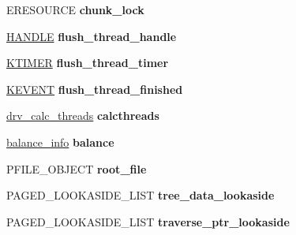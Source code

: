 \begin{DoxyCompactItemize}
\item 
\mbox{\label{struct__device__extension_a30106beebe204fefb92dcdefa857a7bc}} 
E\+R\+E\+S\+O\+U\+R\+CE {\bfseries chunk\+\_\+lock}
\item 
\mbox{\label{struct__device__extension_acc35853bebea7f2443c0e73a67527385}} 
\hyperlink{interfacevoid}{H\+A\+N\+D\+LE} {\bfseries flush\+\_\+thread\+\_\+handle}
\item 
\mbox{\label{struct__device__extension_a719c97122345d6682edd7704352fdf90}} 
\hyperlink{struct___k_t_i_m_e_r}{K\+T\+I\+M\+ER} {\bfseries flush\+\_\+thread\+\_\+timer}
\item 
\mbox{\label{struct__device__extension_a6901244d390909265b7b1e1bd2cd5d9d}} 
\hyperlink{struct___k_e_v_e_n_t}{K\+E\+V\+E\+NT} {\bfseries flush\+\_\+thread\+\_\+finished}
\item 
\mbox{\label{struct__device__extension_a0fecae7f0dfcc7d666621891fd63edfc}} 
\hyperlink{structdrv__calc__threads}{drv\+\_\+calc\+\_\+threads} {\bfseries calcthreads}
\item 
\mbox{\label{struct__device__extension_aa0cac93e722afaf64806cb49e4b9f353}} 
\hyperlink{structbalance__info}{balance\+\_\+info} {\bfseries balance}
\item 
\mbox{\label{struct__device__extension_af2b816839e5035596787f922a307dd79}} 
P\+F\+I\+L\+E\+\_\+\+O\+B\+J\+E\+CT {\bfseries root\+\_\+file}
\item 
\mbox{\label{struct__device__extension_a9b168c1a3f9330601a07a169a96374cf}} 
P\+A\+G\+E\+D\+\_\+\+L\+O\+O\+K\+A\+S\+I\+D\+E\+\_\+\+L\+I\+ST {\bfseries tree\+\_\+data\+\_\+lookaside}
\item 
\mbox{\label{struct__device__extension_aac22b6ef58b885d9881284f6e4740590}} 
P\+A\+G\+E\+D\+\_\+\+L\+O\+O\+K\+A\+S\+I\+D\+E\+\_\+\+L\+I\+ST {\bfseries traverse\+\_\+ptr\+\_\+lookaside}
\item 
\mbox{\label{struct__device__extension_a5e321c1b245cc9e3488d1dd0c621a0ac}} 

\end{DoxyCompactItemize}
